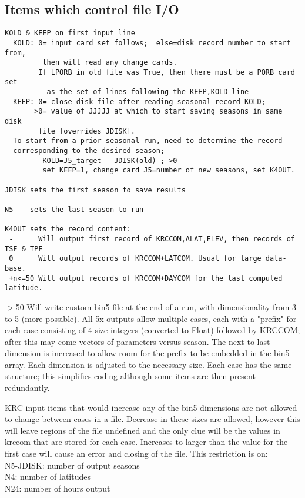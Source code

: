 \documentclass[draft]{article}  %
\newcommand{\qi}{\\ \hspace*{2.em}}      %
\begin{document}
\subsection{Items which control file I/O } %
\vspace{-3.mm} 
\begin{verbatim}
KOLD & KEEP on first input line
  KOLD: 0= input card set follows;  else=disk record number to start from,
         then will read any change cards.
        If LPORB in old file was True, then there must be a PORB card set 
          as the set of lines following the KEEP,KOLD line
  KEEP: 0= close disk file after reading seasonal record KOLD;
       >0= value of JJJJJ at which to start saving seasons in same disk 
        file [overrides JDISK].
  To start from a prior seasonal run, need to determine the record 
  corresponding to the desired season;
         KOLD=J5_target - JDISK(old) ; >0
         set KEEP=1, change card J5=number of new seasons, set K4OUT.

JDISK sets the first season to save results

N5    sets the last season to run

K4OUT sets the record content:
 -      Will output first record of KRCCOM,ALAT,ELEV, then records of TSF & TPF
 0      Will output records of KRCCOM+LATCOM. Usual for large data-base.
 +n<=50 Will output records of KRCCOM+DAYCOM for the last computed latitude.
\end{verbatim}
$>$50 Will write custom bin5 file at the end of a run, with dimensionality from
3 to 5 (more possible). All 5x outputs allow multiple cases, each with a
"prefix" for each case consisting of 4 size integers (converted to Float)
followed by KRCCOM; after this may come vectors of parameters versus season. The
next-to-last dimension is increased to allow room for the prefix to be embedded
in the bin5 array.   Each dimension is adjusted to the
necessary size. Each case has the same structure; this simplifies coding
although some items are then present redundantly.

KRC input items that would increase any of the bin5 dimensions are not allowed
to change between cases in a file. Decrease in these sizes are allowed, however
this will leave regions of the file undefined and the only clue will be the
values in krccom that are stored for each case. Increases to larger than the
value for the first case will cause an error and closing of the file. This
restriction is on:
\qi N5-JDISK: number of output seasons
\qi N4: number of latitudes
\qi N24: number of hours output
\end{document}
